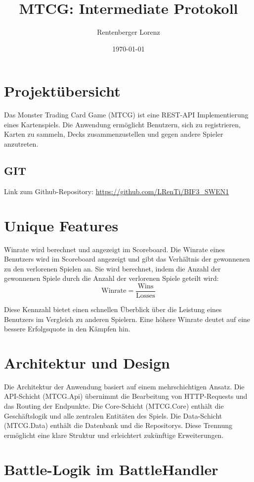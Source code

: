 \documentclass{article}
\title{MTCG: Intermediate Protokoll}
\author{Rentenberger Lorenz}
\date{\today}
\begin{document}
\maketitle

\section{Projektübersicht}
Das Monster Trading Card Game (MTCG) ist eine REST-API Implementierung eines Kartenspiels. Die Anwendung ermöglicht Benutzern, sich zu registrieren, Karten zu sammeln, Decks zusammenzustellen und gegen andere Spieler anzutreten.

\subsection{GIT}
Link zum Github-Repository: \url{https://github.com/LRenTi/BIF3_SWEN1}

\section{Unique Features}
Winrate wird berechnet und angezeigt im Scoreboard. Die Winrate eines Benutzers wird im Scoreboard angezeigt und gibt das Verhältnis der gewonnenen zu den verlorenen Spielen an. Sie wird berechnet, indem die Anzahl der gewonnenen Spiele durch die Anzahl der verlorenen Spiele geteilt wird:
\[
\textrm{Winrate} = \frac{\textrm{Wins}}{\textrm{Losses}}
\]

Diese Kennzahl bietet einen schnellen Überblick über die Leistung eines Benutzers im Vergleich zu anderen Spielern. Eine höhere Winrate deutet auf eine bessere Erfolgsquote in den Kämpfen hin.

\section{Architektur und Design}
Die Architektur der Anwendung basiert auf einem mehrschichtigen Ansatz. Die API-Schicht (MTCG.Api) übernimmt die Bearbeitung von HTTP-Requests und das Routing der Endpunkte. Die Core-Schicht (MTCG.Core) enthält die Geschäftslogik und alle zentralen Entitäten des Spiels. Die Data-Schicht (MTCG.Data) enthält die Datenbank und die Repositorys. Diese Trennung ermöglicht eine klare Struktur und erleichtert zukünftige Erweiterungen.

\section{Battle-Logik im BattleHandler}
\end{document}
